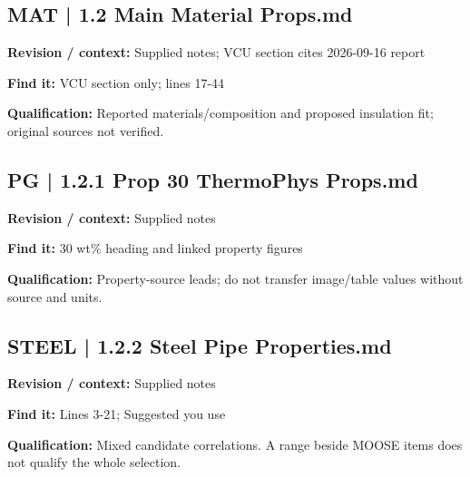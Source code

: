 \documentclass[11pt]{article}
\begin{document}
\par
\par\noindent\begin{minipage}{\textwidth}\small
\subsection*{MAT | 1.2 Main Material Props.md}
\textbf{Revision / context:} Supplied notes; VCU section cites 2026-09-16 report\par
\textbf{Find it:} VCU section only; lines 17-44\par
\textbf{Qualification:} Reported materials/composition and proposed insulation fit; original sources not verified.\par
\end{minipage}\par\vspace{5pt}
\par\noindent\begin{minipage}{\textwidth}\small
\subsection*{PG | 1.2.1 Prop 30 ThermoPhys Props.md}
\textbf{Revision / context:} Supplied notes\par
\textbf{Find it:} 30 wt\% heading and linked property figures\par
\textbf{Qualification:} Property-source leads; do not transfer image/table values without source and units.\par
\end{minipage}\par\vspace{5pt}
\par\noindent\begin{minipage}{\textwidth}\small
\subsection*{STEEL | 1.2.2 Steel Pipe Properties.md}
\textbf{Revision / context:} Supplied notes\par
\textbf{Find it:} Lines 3-21; Suggested you use\par
\textbf{Qualification:} Mixed candidate correlations. A range beside MOOSE items does not qualify the whole selection.\par
\end{minipage}\par\vspace{5pt}
\end{document}
